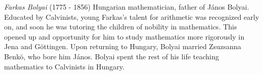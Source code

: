\documentclass[12pt]{article}
\begin{document}
\emph{Farkas Bolyai} (1775 - 1856) Hungarian mathematician, father of J\'anos Bolyai. Educated by Calvinists, young Farkas's talent for arithmetic was recognized early on, and soon he was tutoring the children of nobility in mathematics. This opened up and opportunity for him to study mathematics more rigorously in Jena and G\"ottingen. Upon returning to Hungary, Bolyai married Zsuzsanna Benk\"o, who bore him J\'anos. Bolyai spent the rest of his life teaching mathematics to Calvinists in Hungary.
\end{document}
